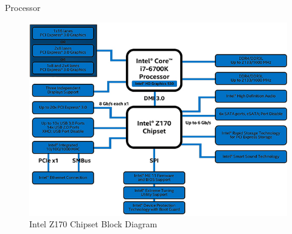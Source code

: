 \documentclass[serif,mathserif]{beamer}
\begin{document}
\begin{frame}{Processor}
  \begin{figure}
  \centering
  \includegraphics[height=0.75\textheight]{Intel-Z170-chipset-block-diagram.jpg}
  \caption{Intel Z170 Chipset Block Diagram}
  \label{fig:intel-z170-chipset}
  \end{figure}
\end{frame}
\end{document}
